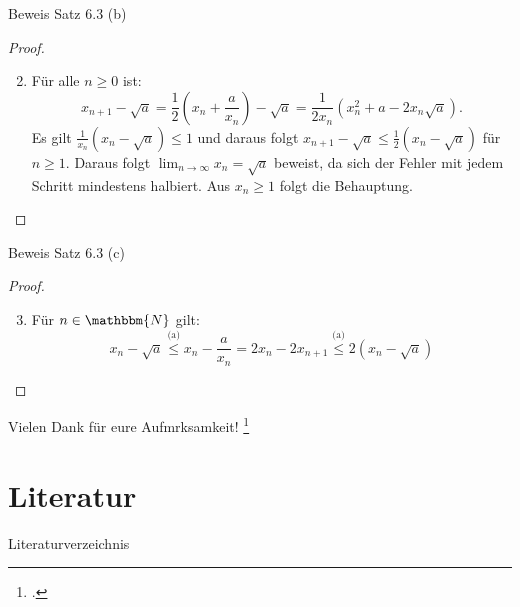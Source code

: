 \documentclass{beamer}
\newcommand{\N}{\mathbbm{N}} %
\begin{document}
    \begin{frame}{Beweis Satz 6.3 (b)}
        \begin{proof}
         \begin{enumerate}[(\alph*)]
         \setcounter{enumi}{1}
              \item Für alle $n \geq 0$ ist:
                \begin{equation*}
                   x_{n+1}-\sqrt{a}= \frac{1}{2} \left(x_n+ \frac{a}{x_n} \right)- \sqrt{a} = \frac{1}{2x_n}(x_n^2+a-2x_n\sqrt{a}).
                \end{equation*}
            Es gilt $\frac{1}{x_n}(x_n-\sqrt{a})\leq 1$ und daraus folgt $x_{n+1}-\sqrt{a} \leq \frac{1}{2}(x_n-\sqrt{a})$ für $n \geq1$. Daraus folgt $\lim_{n \to \infty} x_n = \sqrt{a}$ beweist, da sich der Fehler mit jedem Schritt mindestens halbiert. Aus $x_n \geq 1$ folgt die Behauptung.
            \end{enumerate}
        \end{proof}
    \end{frame}

    \begin{frame}{Beweis Satz 6.3 (c)}
        \begin{proof}
            \begin{enumerate}[(\alph*)]
            \setcounter{enumi}{2}
                \item Für $n \in \N$ gilt:
                  \begin{equation*}
                    x_n-\sqrt{a} \overset{\text{(a)}}{\leq} x_n- \frac{a}{x_n}=  2x_n-2x_{n+1} \overset{\text{(a)}}{\leq} 2(x_n- \sqrt{a}) 
                 \end{equation*}
            \end{enumerate}
        \end{proof}
    \end{frame}

    \begin{frame}{}
        Vielen Dank für eure Aufmrksamkeit! \footcite[Der Vortrag hierzu basiert auf:][]{hougardy2018}
    \end{frame}

    \section*{Literatur}

    \begin{frame}{Literaturverzeichnis}
        \printbibliography
    \end{frame}
\end{document}
